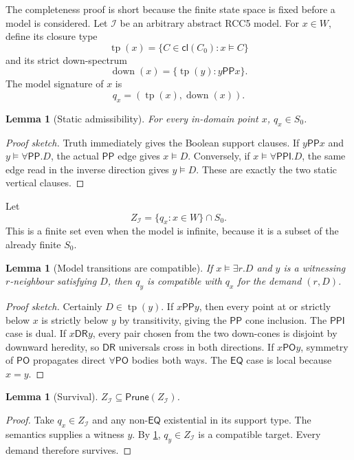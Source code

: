 \documentclass[11pt]{article}
\theoremstyle{plain}
\newtheorem{lemma}[theorem]{Lemma}
\theoremstyle{definition}
\theoremstyle{remark}
\newcommand{\EQ}{\ensuremath{\mathsf{EQ}}}
\newcommand{\PP}{\ensuremath{\mathsf{PP}}}
\newcommand{\PPI}{\ensuremath{\mathsf{PPI}}}
\newcommand{\PO}{\ensuremath{\mathsf{PO}}}
\newcommand{\DR}{\ensuremath{\mathsf{DR}}}
\newcommand{\cl}{\ensuremath{\mathsf{cl}}}
\newcommand{\Prune}{\ensuremath{\mathsf{Prune}}}
\begin{document}
The completeness proof is short because the finite state space is fixed before
a model is considered.  Let $\mathcal I$ be an arbitrary abstract RCC5 model.
For $x\in W$, define its closure type
\[
  \operatorname{tp}(x)=\{C\in\cl(C_0):x\models C\}
\]
and its strict down-spectrum
\[
  \operatorname{down}(x)=
  \{\operatorname{tp}(y):y\PP x\}.
\]
The model signature of $x$ is
\[
  q_x=(\operatorname{tp}(x),\operatorname{down}(x)).
\]

\begin{lemma}[Static admissibility]
For every in-domain point $x$, $q_x\in S_0$.
\end{lemma}

\begin{proof}[Proof sketch]
Truth immediately gives the Boolean support clauses.  If $y\PP x$ and
$y\models\forall\PP.D$, the actual $\PP$ edge gives $x\models D$.
Conversely, if $x\models\forall\PPI.D$, the same edge read in the inverse
direction gives $y\models D$.  These are exactly the two static vertical
clauses.
\end{proof}

Let
\[
  Z_{\mathcal I}=\{q_x:x\in W\}\cap S_0.
\]
This is a finite set even when the model is infinite, because it is a subset
of the already finite $S_0$.

\begin{lemma}[Model transitions are compatible]
\label{lem:modelcompat}
If $x\models\exists r.D$ and $y$ is a witnessing $r$-neighbour satisfying
$D$, then $q_y$ is compatible with $q_x$ for the demand $(r,D)$.
\end{lemma}

\begin{proof}[Proof sketch]
Certainly $D\in\operatorname{tp}(y)$.  If $x\PP y$, then every point at or
strictly below $x$ is strictly below $y$ by transitivity, giving the $\PP$
cone inclusion.  The $\PPI$ case is dual.  If $x\DR y$, every pair chosen from
the two down-cones is disjoint by downward heredity, so $\DR$ universals cross
in both directions.  If $x\PO y$, symmetry of $\PO$ propagates direct
$\forall\PO$ bodies both ways.  The $\EQ$ case is local because $x=y$.
\end{proof}

\begin{lemma}[Survival]
\label{lem:survival}
$Z_{\mathcal I}\subseteq\Prune(Z_{\mathcal I})$.
\end{lemma}

\begin{proof}
Take $q_x\in Z_{\mathcal I}$ and any non-$\EQ$ existential in its support
type.  The semantics supplies a witness $y$.  By
\cref{lem:modelcompat}, $q_y\in Z_{\mathcal I}$ is a compatible target.
Every demand therefore survives.
\end{proof}
\end{document}
